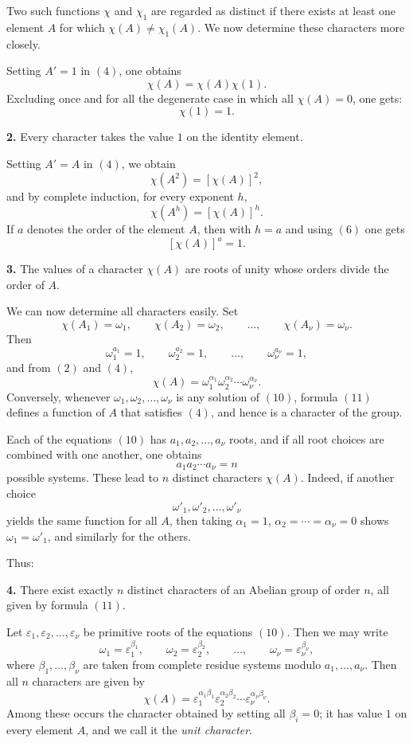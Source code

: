 \documentclass[11pt]{article}
\begin{document}
Two such functions \(\chi\) and \(\chi_1\) are regarded as distinct if there exists at least one element \(A\) for which \(\chi(A)\neq \chi_1(A)\). We now determine these characters more closely.

Setting \(A'=1\) in \((4)\), one obtains
\[
\chi(A)=\chi(A)\chi(1).
\tag{5}
\]
Excluding once and for all the degenerate case in which all \(\chi(A)=0\), one gets:
\[
\chi(1)=1.
\tag{6}
\]

\medskip
\noindent\textbf{2.} Every character takes the value \(1\) on the identity element.

\medskip
Setting \(A'=A\) in \((4)\), we obtain
\[
\chi(A^2)=[\chi(A)]^2,
\]
and by complete induction, for every exponent \(h\),
\[
\chi(A^h)=[\chi(A)]^h.
\tag{7}
\]
If \(a\) denotes the order of the element \(A\), then with \(h=a\) and using \((6)\) one gets
\[
[\chi(A)]^a=1.
\tag{8}
\]

\medskip
\noindent\textbf{3.} The values of a character \(\chi(A)\) are roots of unity whose orders divide the order of \(A\).

\medskip
We can now determine all characters easily. Set
\[
\chi(A_1)=\omega_1,\qquad \chi(A_2)=\omega_2,\qquad \dots,\qquad \chi(A_\nu)=\omega_\nu.
\tag{9}
\]
Then
\[
\omega_1^{a_1}=1,\qquad \omega_2^{a_2}=1,\qquad \dots,\qquad \omega_\nu^{a_\nu}=1,
\tag{10}
\]
and from \((2)\) and \((4)\),
\[
\chi(A)=\omega_1^{\alpha_1}\omega_2^{\alpha_2}\cdots \omega_\nu^{\alpha_\nu}.
\tag{11}
\]
Conversely, whenever \(\omega_1,\omega_2,\dots,\omega_\nu\) is any solution of \((10)\), formula \((11)\) defines a function of \(A\) that satisfies \((4)\), and hence is a character of the group.

Each of the equations \((10)\) has \(a_1,a_2,\dots,a_\nu\) roots, and if all root choices are combined with one another, one obtains
\[
a_1a_2\cdots a_\nu=n
\]
possible systems. These lead to \(n\) distinct characters \(\chi(A)\). Indeed, if another choice
\[
\omega'_1,\omega'_2,\dots,\omega'_\nu
\]
yields the same function for all \(A\), then taking \(\alpha_1=1\), \(\alpha_2=\cdots=\alpha_\nu=0\) shows \(\omega_1=\omega'_1\), and similarly for the others.

Thus:

\medskip
\noindent\textbf{4.} There exist exactly \(n\) distinct characters of an Abelian group of order \(n\), all given by formula \((11)\).

\medskip
Let \(\varepsilon_1,\varepsilon_2,\dots,\varepsilon_\nu\) be primitive roots of the equations \((10)\). Then we may write
\[
\omega_1=\varepsilon_1^{\beta_1},\qquad \omega_2=\varepsilon_2^{\beta_2},\qquad \dots,\qquad \omega_\nu=\varepsilon_\nu^{\beta_\nu},
\tag{12}
\]
where \(\beta_1,\dots,\beta_\nu\) are taken from complete residue systems modulo \(a_1,\dots,a_\nu\). Then all \(n\) characters are given by
\[
\chi(A)=\varepsilon_1^{\alpha_1\beta_1}\varepsilon_2^{\alpha_2\beta_2}\cdots\varepsilon_\nu^{\alpha_\nu\beta_\nu}.
\tag{13}
\]
Among these occurs the character obtained by setting all \(\beta_i=0\); it has value \(1\) on every element \(A\), and we call it the \emph{unit character}.
\end{document}
